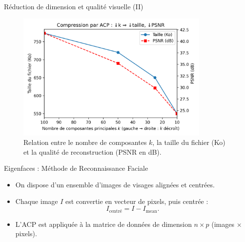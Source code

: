 \documentclass{beamer}
\begin{document}
\begin{frame}{Réduction de dimension et qualité visuelle (II)}
\begin{figure}
  \centering
  \includegraphics[width=0.85\textwidth]{images/pca_storage_vs_quality.png}
  \caption{Relation entre le nombre de composantes $k$, la taille du fichier (Ko) et la qualité de reconstruction (PSNR en dB).}
\end{figure}

\end{frame}

\begin{frame}{Eigenfaces : Méthode de Reconnaissance Faciale}
\begin{itemize}
  \item On dispose d’un ensemble d’images de visages alignées et centrées.
  \item Chaque image $I$ est convertie en vecteur de pixels, puis centrée : 
        \[
          I_{\text{centré}} = I - I_{\text{mean}}.
        \]
  \item L’ACP est appliquée à la matrice de données de dimension $n \times p$ (images × pixels).
\end{itemize}
\end{frame}
\end{document}
